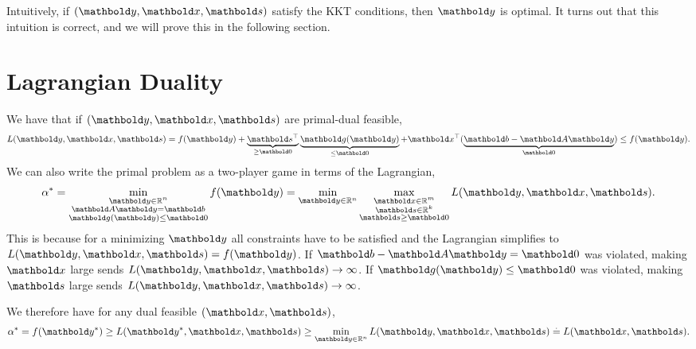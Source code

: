 Intuitively, if $(\vy, \vx, \vs)$ satisfy the KKT conditions, then $\vy$ is optimal. It turns out that this intuition is correct, and we will prove this in the following section.

\section{Lagrangian Duality}

We have that if $(\vy, \vx, \vs)$ are primal-dual feasible, \begin{align}
    L(\vy, \vx, \vs) = f(\vy) + \underbrace{\trans{\vs}}_{\geq \vZero}\underbrace{\vg(\vy)}_{\leq \vZero} + \trans{\vx}(\underbrace{\vb - \mA\vy}_{\vZero}) \leq f(\vy).
\end{align} We can also write the primal problem as a two-player game in terms of the Lagrangian, \begin{align}
    \s{\alpha} = \min_{\substack{\vy \in \R^n \\ \mA\vy = \vb \\ \vg(\vy) \leq \vZero}} f(\vy) = \min_{\vy \in \R^n} \max_{\substack{\vx \in \R^m \\ \vs \in \R^k \\ \vs \geq \vZero}} L(\vy, \vx, \vs).
\end{align} This is because for a minimizing $\vy$ all constraints have to be satisfied and the Lagrangian simplifies to $L(\vy, \vx, \vs) = f(\vy)$. If $\vb - \mA\vy = \vZero$ was violated, making $\vx$ large sends $L(\vy, \vx, \vs) \to \infty$. If $\vg(\vy) \leq \vZero$ was violated, making $\vs$ large sends $L(\vy, \vx, \vs) \to \infty$.

We therefore have for any dual feasible $(\vx, \vs)$, \begin{align}
    \s{\alpha} = f(\s{\vy}) \geq L(\s{\vy}, \vx, \vs) \geq \min_{\vy \in \R^n} L(\vy, \vx, \vs) \eqdef L(\vx, \vs). \label{eq:weak_duality}
\end{align}

